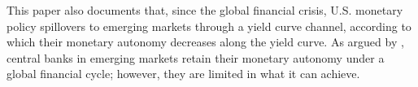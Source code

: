 {This paper also documents that, since the global financial crisis, U.S. monetary policy spillovers to emerging markets through a yield curve channel, according to which their monetary autonomy decreases along the yield curve.
As argued by \cite{Obstfeld:2015}, central banks in emerging markets 
retain their monetary autonomy under a global financial cycle; however, they are limited in what it can achieve.

}
